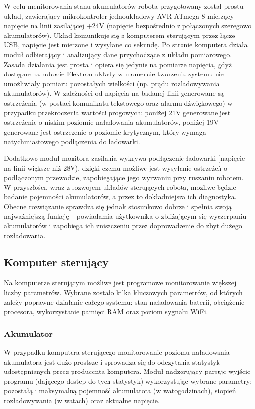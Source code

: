 W celu monitorowania stanu akumulatorów robota przygotowany został prostu układ,
zawierający mikrokontroler jednoukładowy AVR ATmega 8 mierzący napięcie na linii
zasilającej +24V (napięcie bezpośrednio z połączonych szeregowo akumulatorów).
Układ komunikuje się z komputerem sterującym przez łącze USB, napięcie jest
mierzone i wysyłane co sekundę. Po stronie komputera działa moduł odbierający i
analizujący dane przychodzące z układu pomiarowego. Zasada działania jest prosta
i opiera się jedynie na pomiarze napięcia, gdyż dostępne na robocie Elektron
układy w momencie tworzenia systemu nie umożliwiały pomiaru pozostałych
wielkości (np. prądu rozładowywania akumulatorów). W zależności od napięcia na
badanej linii generowane są ostrzeżenia (w postaci komunikatu tekstowego oraz
alarmu dźwiękowego) w przypadku przekroczenia wartości progowych: poniżej 21V
generowane jest ostrzeżenie o niskim poziomie naładowania akumulatorów, poniżej
19V generowane jest ostrzeżenie o poziomie krytycznym, który wymaga
natychmiastowego podłączenia do ładowarki.

Dodatkowo moduł monitora zasilania wykrywa podłączenie ładowarki (napięcie na
linii większe niż 28V), dzięki czemu możliwe jest wysyłanie ostrzeżeń o
podłączonym przewodzie, zapobiegające jego wyrwaniu przy ruszaniu robotem. W
przyszłości, wraz z rozwojem układów sterujących robota, możliwe będzie badanie
pojemności akumulatorów, a przez to dokładniejsza ich diagnostyka. Obecne
rozwiązanie sprawdza się jednak stosunkowo dobrze i spełnia swoją najważniejszą
funkcję -- powiadamia użytkownika o zbliżającym się wyczerpaniu akumulatorów i
zapobiega ich zniszczeniu przez doprowadzenie do zbyt dużego rozładowania.

\subsection{Komputer sterujący}

Na komputerze sterującym możliwe jest programowe monitorowanie większej liczby
parametrów. Wybrane zostało kilka kluczowych parametrów, od których zależy
poprawne działanie całego systemu: stan naładowania baterii, obciążenie
procesora, wykorzystanie pamięci RAM oraz poziom sygnału WiFi.

\subsubsection{Akumulator}

W przypadku komputera sterującego monitorowanie poziomu naładowania akumulatora
jest dużo prostsze i sprowadza się do odczytania statystyk udostępnianych przez
producenta komputera. Moduł nadzorujący parsuje wyjście programu 
(dającego dostep do tych statystyk) wykorzystując wybrane parametry: pozostałą i
maksymalną pojemność akumulatora (w watogodzinach), stopień rozładowywania (w
watach) oraz aktualne napięcie.

